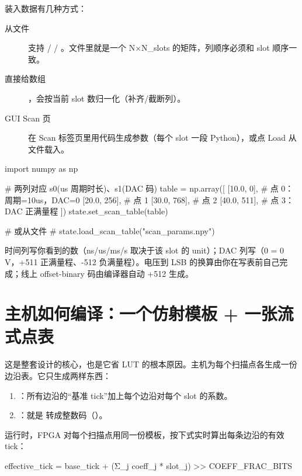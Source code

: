 \documentclass[11pt,oneside,openany]{book}
\begin{document}
装入数据有几种方式：

\begin{description}
\item[从文件]  支持  /  / 。文件里就是一个 N×N\_slots 的矩阵，列顺序必须和 slot 顺序一致。
\item[直接给数组] ，会按当前 slot 数归一化（补齐/截断列）。
\item[GUI Scan 页] 在 Scan 标签页里用代码生成参数（每个 slot 一段 Python），或点 Load 从文件载入。
\end{description}

\begin{codeblock}[Python]
import numpy as np

# 两列对应 s0(us 周期时长)、s1(DAC 码)
table = np.array([
    [10.0,    0],     # 点 0：周期=10us，DAC=0
    [20.0,  256],     # 点 1
    [30.0,  768],     # 点 2
    [40.0, 511],      # 点 3：DAC 正满量程
])
state.set_scan_table(table)

# 或从文件
# state.load_scan_table("scan_params.npy")
\end{codeblock}

\begin{notebox}[单位约定再强调一次]
时间列写你看到的数（ns/us/ms/s 取决于该 slot 的 unit）；DAC 列写（0 = 0 V，+511 正满量程、-512 负满量程）。电压到 LSB 的换算由你在写表前自己完成；线上 offset-binary 码由编译器自动 +512 生成。
\end{notebox}

\section{主机如何编译：一个仿射模板 + 一张流式点表}

这是整套设计的核心，也是它省 LUT 的根本原因。主机为每个扫描点各生成一份边沿表。它只生成两样东西：

\begin{enumerate}
\item {}：所有边沿的“基准 tick”加上每个边沿对每个 slot 的系数。
\item {}：就是  转成整数码（）。
\end{enumerate}

运行时，FPGA 对每个扫描点用同一份模板，按下式实时算出每条边沿的有效 tick：

\begin{codeblock}[text]
effective_tick = base_tick + (Σ_j coeff_j * slot_j) >> COEFF_FRAC_BITS
\end{codeblock}
\end{document}
